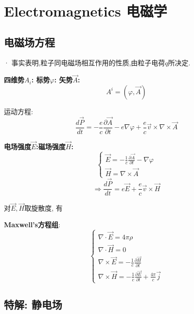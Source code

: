 \documentclass{article}
\begin{document}
\section{Electromagnetics 电磁学}
    \subsection{电磁场方程}
        · 事实表明,粒子同电磁场相互作用的性质,由粒子电荷$q$所决定.
    
        \textbf{四维势$A_{i}$: \quad 标势$\varphi$: \quad 矢势$\vec A$:}
            $$A^{i}=(\varphi,\vec A)$$
            
        运动方程:
            $$\frac{d\vec P}{dt} = - \frac{e}{c} \frac{\partial\vec A}{\partial t} - e \nabla \varphi + \frac{e}{c} \vec v \times \nabla \times \vec A$$
            
        \textbf{电场强度$\vec E$:\quad 磁场强度$\vec H$:}
            \begin{displaymath}
                \left\{ \begin{array}{ll}
                \vec E = -\frac{1}{c} \frac{\partial \vec A}{\partial t} - \nabla \varphi\\
                \vec H = \nabla \times \vec A
                \end{array} \right.
            \end{displaymath}
            $$\Rightarrow \frac{d\vec P}{dt} = e \vec E + \frac{e}{c} \vec v \times \vec H$$
            
        对$\vec E,\vec H$取旋散度, 有
        
        \textbf{Maxwell's方程组}:
            \begin{displaymath}
                \left\{ \begin{array}{ll}
                \nabla \cdot \vec E = 4\pi\rho\\
                \nabla \cdot \vec H = 0\\
                \nabla \times \vec E = - \frac{1}{c} \frac{\partial \vec H}{\partial t}\\
                \nabla \times \vec H = - \frac{1}{c} \frac{\partial \vec E}{\partial t} + \frac{4\pi}{c}\vec j
                \end{array} \right.
            \end{displaymath}


\subsection{特解: 静电场}
\end{document}
